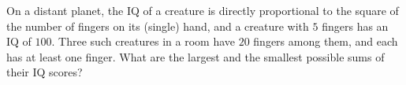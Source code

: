 On a distant planet, the IQ of a creature is directly proportional to the square of the number of fingers on its (single) hand, and a creature with $5$ fingers has an IQ of $100$. Three such creatures in a room have $20$ fingers among them, and each has at least one finger. What are the largest and the smallest possible sums of their IQ scores?
